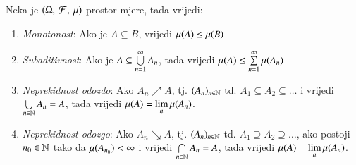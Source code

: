 \begin{tm}
    Neka je $(\Omega, \: \mathcal{F}, \: \mu)$ prostor mjere, tada vrijedi:
    \begin{enumerate}[label={(\roman*)}]
        \item \emph{Monotonost}: Ako je $A \subseteq B$, vrijedi \label{tmOsSvVjerojMon}
            $\mu({A}) \leq \mu({B})$
        \item \emph{Subaditivnost}: Ako je $A \subseteq \bigcup\limits_{n=1}^{\infty} A_n$, tada
            vrijedi $\mu({A}) \leq \sum\limits_{n=1}^{\infty} \mu({A_n})$
        \item \emph{Neprekidnost odozdo}: Ako $A_n \nearrow A$, \label{tmOsSvVjerojNOdd}
            tj. $(A_n)_{n \in \mathbb{N}}$ td. $A_1 \subseteq A_2 \subseteq \dots$ i vrijedi
            $\bigcup\limits_{n \in \mathbb{N}}^{} A_n = A$, tada vrijedi $\mu({A}) =
            \lim\limits_{n} \mu({A_n})$.
        \item \emph{Neprekidnost odozgo}: Ako $A_n \searrow A$, tj. $(A_n)_{n \in \mathbb{N}}$ td.
            $A_1 \supseteq A_2 \supseteq \dots$, ako postoji $n_0 \in \mathbb{N}$ tako da
            $\mu({A_{n_0}}) < \infty$ i vrijedi $\bigcap\limits_{n \in \mathbb{N}}^{} A_n = A$,
            tada vrijedi $\mu({A}) = \lim\limits_{n} \mu({A_n})$.
    \end{enumerate}
\end{tm}

